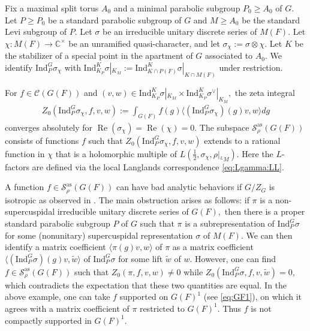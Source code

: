 \documentclass[10pt]{amsart}
\theoremstyle{definition}
\numberwithin{equation}{section}
\numberwithin{equation}{subsection}
\newcommand{\Ind}{\mathrm{Ind}}
\newcommand{\CC}{\mathbb{C}}
\renewcommand{\Re}{\mathop{\mathrm{Re}}}
\begin{document}
Fix a maximal split torus $A_0$ and a minimal parabolic subgroup $P_0\ge A_0$ of $G$. Let $P\ge P_0$ be a standard parabolic subgroup of $G$ and $M\ge A_0$ be the standard Levi subgroup of $P$. Let $\sigma$ be an irreducible unitary discrete series of $M(F)$. Let $\chi:M(F)\to \CC^\times$ be an unramified quasi-character, and let $\sigma_\chi:=\sigma\otimes \chi.$ Let $K$ be the stabilizer of a special point in the apartment of $G$ associated to $A_0$. We identify $\mathrm{Ind}_P^G\sigma_\chi$ with $\Ind_{K_P}^K\sigma|_{K_M}:=\Ind_{K\cap P(F)}^K\sigma|_{K\cap M(F)}$ under restriction.

For $f\in \mathcal{C}(G(F))$ and $(v,w)\in \Ind_{K_P}^K\sigma|_{K_M}\times \Ind_{K_P}^K\sigma^\lor|_{K_M},$ the zeta integral 
\begin{align*}
    Z_0(\mathrm{Ind}_P^G \sigma_\chi,f,v,w):=\int_{G(F)} f(g)\langle (\mathrm{Ind}_P^G\sigma_\chi)(g)v,w\rangle dg
\end{align*} 
converges absolutely for $\Re (\sigma_\chi)=\Re(\chi)=0.$ The subspace  $\mathcal{S}^{\mathrm{as}}_\rho(G(F))$ consists of functions $f$ such that $Z_0(\mathrm{Ind}_P^G \sigma_\chi,f,v,w)$ extends to a rational function in $\chi$ that is a holomorphic multiple of $L(\tfrac{1}{2},\sigma_\chi,\rho|_{{}^LM})$. Here the $L$-factors are defined via the local Langlands correspondence \eqref{eq:Lgamma:LL}. 

A function $f\in \mathcal{S}_\rho^{\mathrm{as}}(G(F))$ can have bad analytic behaviors if $G/Z_G$ is isotropic as observed in \cite[Example 6.2]{DRS}. The main obstruction arises as follows: if $\pi$ is a non-supercuspidal irreducible unitary discrete series of $G(F),$ then there is a proper standard parabolic subgroup $P$ of $G$  such that $\pi$ is a subrepresentation of $\Ind_P^G \sigma$ for some (nonunitary) supercuspidal representation $\sigma$ of $M(F).$ We can then identify a matrix coefficient $\langle \pi(g)v,w\rangle$ of $\pi$ as a matrix coefficient $\langle (\mathrm{Ind}_P^G\sigma)(g)v,\tilde{w}\rangle$ of $\Ind_P^G \sigma$ for some lift $\tilde{w}$ of $w$. However, one can find $f\in \mathcal{S}_\rho^{\mathrm{as}}(G(F))$ such that $Z_0(\pi,f,v,w)\neq 0$ while $Z_0(\mathrm{Ind}_P^G\sigma,f, v,\tilde{w})=0,$ which contradicts the expectation that these two quantities are equal. In the above example, one can take $f$ supported on $G(F)^1$ (see \eqref{eq:GF1}), on which it agrees with a matrix coefficient of $\pi$ restricted to $G(F)^1$. Thus $f$ is not compactly supported in $G(F)^1.$
\end{document}
